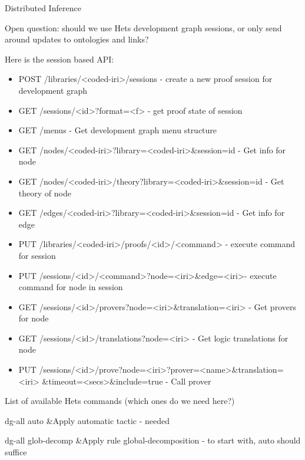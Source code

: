 \documentclass{article}
\begin{document}
Distributed Inference

Open question: should we use Hets development graph sessions, or only
send around updates to ontologies and links?

Here is the session based API:

\begin{itemize}
\item POST /libraries/{\textless}coded-iri{\textgreater}/sessions -
create a new proof session for development graph
\item GET
/sessions/{\textless}id{\textgreater}?format={\textless}f{\textgreater}
- get proof state of session
\item GET /menus - Get development graph menu structure
\item GET
/nodes/{\textless}coded-iri{\textgreater}?library={\textless}coded-iri{\textgreater}\&session=id
- Get info for node
\item GET
/nodes/{\textless}coded-iri{\textgreater}/theory?library={\textless}coded-iri{\textgreater}\&session=id
- Get theory of node
\item GET
/edges/{\textless}coded-iri{\textgreater}?library={\textless}coded-iri{\textgreater}\&session=id
- Get info for edge
\item PUT
/libraries/{\textless}coded-iri{\textgreater}/proofs/{\textless}id{\textgreater}/{\textless}command{\textgreater}
- execute command for session
\item PUT
/sessions/{\textless}id{\textgreater}/{\textless}command{\textgreater}?node={\textless}iri{\textgreater}\&edge={\textless}iri{\textgreater}-
execute command for node in session
\item GET
/sessions/{\textless}id{\textgreater}/provers?node={\textless}iri{\textgreater}\&translation={\textless}iri{\textgreater}
- Get provers for node
\item GET
/sessions/{\textless}id{\textgreater}/translations?node={\textless}iri{\textgreater}
- Get logic translations for node
\item PUT
/sessions/{\textless}id{\textgreater}/prove?node={\textless}iri{\textgreater}?prover={\textless}name{\textgreater}\&translation={\textless}iri{\textgreater}
\&timeout={\textless}secs{\textgreater}\&include=true - Call prover
\end{itemize}
List of available Hets commands (which ones do we need here?)

dg-all auto
&Apply
automatic tactic - needed 

dg-all glob-decomp &Apply rule
global-decomposition - to start with, auto should suffice
\end{document}
